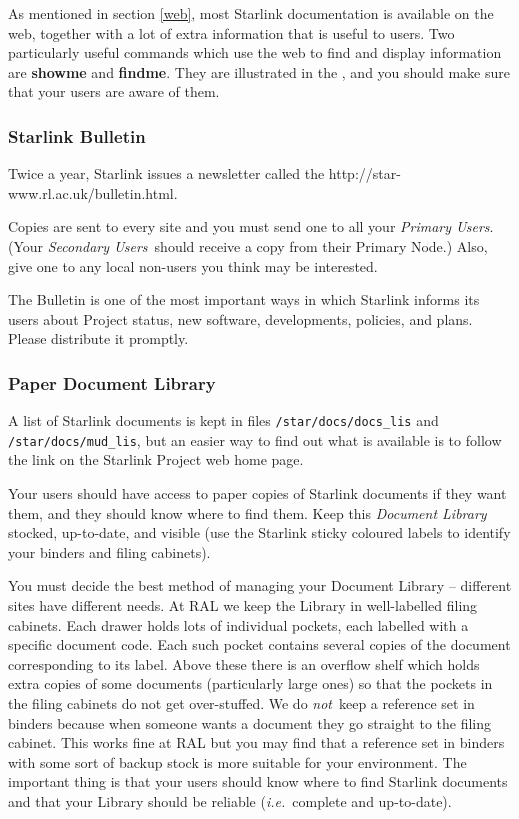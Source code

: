 As mentioned in section \ref{web},
most Starlink documentation is available on the web, together with a lot of
extra information that is useful to users.
Two particularly useful commands which use the web to find and display
information are {\bf showme} and {\bf findme}.
They are illustrated in the , and
you should make sure that your users are aware of them.

\subsubsection{Starlink Bulletin}

Twice a year, Starlink issues a newsletter called the 
{http://star-www.rl.ac.uk/bulletin.html}.

Copies are sent to every site and you must send one to all your {\em Primary
Users}.
(Your {\em Secondary Users}\, should receive a copy from their Primary Node.)
Also, give one to any local non-users you think may be interested.

The Bulletin is one of the most important ways in which Starlink informs its
users about Project status, new software, developments, policies, and plans.
Please distribute it promptly.

\subsubsection{\label{documentlibrary}Paper Document Library}

A list of Starlink documents is kept in files
    {\tt /star/docs/docs\_lis}
and {\tt /star/docs/mud\_lis},
but an easier way to find out what is available is to follow the
link on the Starlink Project web home page.

Your users should have access to paper copies of Starlink documents if they
want them, and they should know where to find them.
Keep this {\em Document Library}\, stocked, up-to-date, and visible (use the
Starlink sticky coloured labels to identify your binders and filing cabinets).

You must decide the best method of managing your Document Library -- different
sites have different needs.
At RAL we keep the Library in well-labelled filing cabinets.
Each drawer holds lots of individual pockets, each labelled with a specific
document code.
Each such pocket contains several copies of the document corresponding to its
label.
Above these there is an overflow shelf which holds extra copies of some
documents (particularly large ones) so that the pockets in the filing cabinets
do not get over-stuffed.
We do {\em not}\, keep a reference set in binders because when someone wants a
document they go straight to the filing cabinet.
This works fine at RAL but you may find that a reference set in binders with
some sort of backup stock is more suitable for your environment.
The important thing is that your users should know where to find Starlink
documents and that your Library should be reliable ({\em i.e.}\, complete
and up-to-date).

